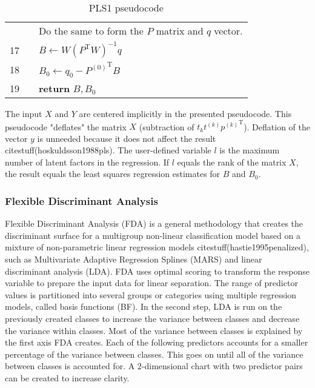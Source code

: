 \documentclass[preprint,12pt]{elsarticle}
\begin{document}
\begin{table}[ht]
{\begin{tabular}{|r l l l l|}
            \rowcolor{backcolour} & & \multicolumn{3}{l|}{Do the same to form the $P$ matrix and $q$ vector.} \\
            \rowcolor{backcolour} 17 & & \multicolumn{3}{l|}{$B\gets W{(P^{\mathrm{T}}W)}^{-1}q$} \\
            \rowcolor{backcolour} 18 & & \multicolumn{3}{l|}{$B_{0}\gets q_{0}-{P^{(0)}}^{\mathrm{T}}B$} \\
            \rowcolor{backcolour} 19 & & \multicolumn{3}{l|}{\textbf{return} $B, B_{0}$} \\
            \hline
        \end{tabular}
    }
    \caption{PLS1 pseudocode}
    \label{tab:PLS1}
\end{table}

The input $X$ and $Y$ are centered implicitly in the presented pseudocode. This pseudocode "deflates" the matrix $X$ (subtraction of $t_{k}t^{(k)}{p^{(k)}}^{\mathrm{T}}$). Deflation of the vector $y$ is unneeded because it does not affect the result citestuff(hoskuldsson1988pls). The user-defined variable $l$ is the maximum number of latent factors in the regression. If $l$ equals the rank of the matrix $X$, the result equals the least squares regression estimates for $B$ and $B_{0}$.

\subsubsection{Flexible Discriminant Analysis}

Flexible Discriminant Analysis (FDA) is a general methodology that creates the discriminant surface for a multigroup non-linear classification model based on a mixture of non-parametric linear regression models citestuff(hastie1995penalized), such as Multivariate Adaptive Regression Splines (MARS) and linear discriminant analysis (LDA). FDA uses optimal scoring to transform the response variable to prepare the input data for linear separation. The range of predictor values is partitioned into several groups or categories using multiple regression models, called basis functions (BF). In the second step, LDA is run on the previously created classes to increase the variance between classes and decrease the variance within classes. 
Most of the variance between classes is explained by the first axis FDA creates. Each of the following predictors accounts for a smaller percentage of the variance between classes. This goes on until all of the variance between classes is accounted for. A $2$-dimensional chart with two predictor pairs can be created to increase clarity.
\end{document}
